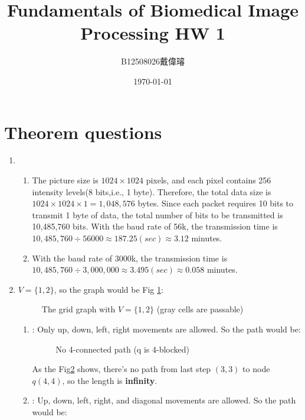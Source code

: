 \documentclass[12pt,a4paper]{article}
\title{Fundamentals of Biomedical Image Processing HW 1}
\author{B12508026戴偉璿}
\date{\today}
\begin{document}
\maketitle
{}

\section{Theorem questions}
\begin{enumerate}
    \item
    \begin{enumerate}
        \item The picture size is $1024\times 1024$ pixels, and each pixel contains 256 intensity levels(8 bits,i.e., 1 byte). Therefore, the total data size is $1024\times 1024 \times 1 = 1,048,576$ bytes. Since each packet requires 10 bits to transmit 1 byte of data, the total number of bits to be transmitted is 10,485,760 bits. With the baud rate of 56k, the transmission time is $10,485,760\div 56000 \approx 187.25(sec)\approx 3.12$ minutes.
        \item With the baud rate of 3000k, the transmission time is\\ $10,485,760\div 3,000,000 \approx 3.495(sec)\approx 0.058$ minutes.
    \end{enumerate}
    \item $V=\{1 ,2\}$, so the graph would be Fig \ref{fig:2a}:
    \begin{figure}[H]
        \centering
        
        \caption{The grid graph with $V=\{1,2\}$ (gray cells are passable)}
        \label{fig:2a}
    \end{figure}
    \newpage
    \begin{enumerate}
        \item {}: Only up, down, left, right movements are allowed. So the path would be:
        \begin{figure}[H]
            \centering
            
            \caption{No 4-connected path (q is 4-blocked)}
            \label{fig:2a_s4}
        \end{figure}
        As the Fig\ref{fig:2a_s4} shows, there's no path from last step $(3, 3)$ to node $q(4, 4)$, so the length is \textbf{infinity}.
        \item {}: Up, down, left, right, and diagonal movements are allowed. So the path would be:
        \begin{figure}[H]

\end{figure}
\end{enumerate}
\end{enumerate}
\end{document}

